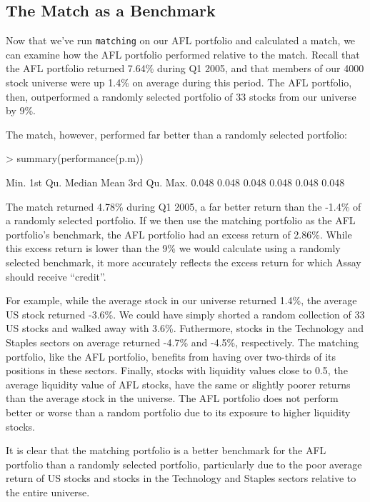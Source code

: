 \documentclass{article}
\begin{document}
\subsection{The Match as a Benchmark}

Now that we've run \texttt{matching} on our AFL portfolio and
calculated a match, we can examine how the AFL portfolio performed
relative to the match.  Recall that the AFL portfolio returned 7.64\%
during Q1 2005, and that members of our 4000 stock universe were up
1.4\% on average during this period.  The AFL portfolio, then,
outperformed a randomly selected portfolio of 33 stocks from our
universe by 9\%.

The match, however, performed far better than a randomly selected portfolio:

\begin{Schunk}
\begin{Sinput}
> summary(performance(p.m))
\end{Sinput}
\begin{Soutput}
   Min. 1st Qu.  Median    Mean 3rd Qu.    Max. 
  0.048   0.048   0.048   0.048   0.048   0.048 
\end{Soutput}
\end{Schunk}

The match returned 4.78\% during Q1 2005, a far better return than the
-1.4\% of a randomly selected portfolio.  If we then use the matching
portfolio as the AFL portfolio's benchmark, the AFL portfolio had an
excess return of 2.86\%.  While this excess return is lower than the
9\% we would calculate using a randomly selected benchmark, it more
accurately reflects the excess return for which Assay should receive
``credit''.

For example, while the average stock in our universe returned 1.4\%,
the average US stock returned -3.6\%.  We could have simply shorted a
random collection of 33 US stocks and walked away with 3.6\%.
Futhermore, stocks in the Technology and Staples sectors on average
returned -4.7\% and -4.5\%, respectively.  The matching portfolio,
like the AFL portfolio, benefits from having over two-thirds of its
positions in these sectors.  Finally, stocks with liquidity values
close to 0.5, the average liquidity value of AFL stocks, have the same
or slightly poorer returns than the average stock in the universe.
The AFL portfolio does not perform better or worse than a random
portfolio due to its exposure to higher liquidity stocks.

It is clear that the matching portfolio is a better benchmark for the
AFL portfolio than a randomly selected portfolio, particularly due to
the poor average return of US stocks and stocks in the Technology and
Staples sectors relative to the entire universe.


\end{document}
